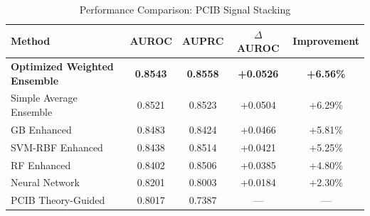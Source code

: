\begin{table}[htbp]
  \centering
  \caption{Performance Comparison: PCIB Signal Stacking}
  \label{tab:stacking_performance}
  \begin{tabular}{lcccc}
    \toprule
    Method & AUROC & AUPRC & $\Delta$ AUROC & Improvement \\
    \midrule
    \textbf{Optimized Weighted Ensemble} & \textbf{0.8543} & \textbf{0.8558} & \textbf{+0.0526} & \textbf{+6.56\%} \\
    Simple Average Ensemble & 0.8521 & 0.8523 & +0.0504 & +6.29\% \\
    GB Enhanced & 0.8483 & 0.8424 & +0.0466 & +5.81\% \\
    SVM-RBF Enhanced & 0.8438 & 0.8514 & +0.0421 & +5.25\% \\
    RF Enhanced & 0.8402 & 0.8506 & +0.0385 & +4.80\% \\
    Neural Network & 0.8201 & 0.8003 & +0.0184 & +2.30\% \\
    PCIB Theory-Guided & 0.8017 & 0.7387 & --- & --- \\
    \bottomrule
  \end{tabular}
\end{table}